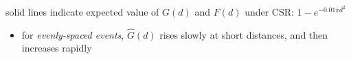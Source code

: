 \documentclass[portrait]{seminar}
\begin{document}
%
%
\begin{slide*}
\begin{center}
 \vspace*{-0.5cm} 
\end{center}

\vspace{0.1cm}
\begin{center}
\begin{figure}
\end{figure}
\end{center}

\vspace{0.1cm}
\begin{center}
\begin{figure}
\hspace{-0.3cm}
\hspace{0.5cm}
\end{figure}
\end{center}

\begin{center}
{\small solid lines indicate expected value of $G(d)$ and $F(d)$
under CSR: $1 - e^{-0.01 \pi d^2 }$ }
\end{center}

\vspace{0.3cm}
\begin{itemize}
\item for {\em evenly-spaced events}, $\hat{G}(d)$ rises slowly
at short distances, and then increases rapidly
\end{itemize}


\end{slide*}
\end{document}
